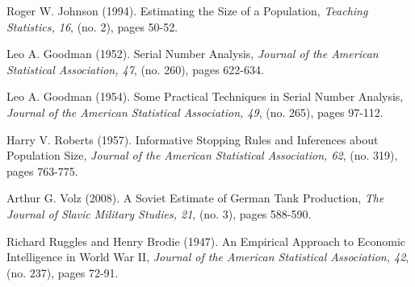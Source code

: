 \bigskip


\begin{thebibliography}{10}

 Roger W. Johnson (1994). Estimating the Size of a Population, {\em Teaching Statistics, 16}, (no. 2), pages 50-52.

 Leo A. Goodman (1952). Serial Number Analysis, {\em Journal of the American Statistical Association, 47}, (no. 260), pages 622-634.

 Leo A. Goodman (1954). Some Practical Techniques in Serial Number Analysis, {\em Journal of the American Statistical Association, 49}, (no. 265), pages 97-112.

 Harry V. Roberts (1957). Informative Stopping Rules and Inferences about Population Size, {\em Journal of the American Statistical Association, 62}, (no. 319), pages 763-775.

 Arthur G. Volz (2008). A Soviet Estimate of German Tank Production, {\em The Journal of Slavic Military Studies, 21}, (no. 3), pages 588-590.

 Richard Ruggles and Henry Brodie (1947). An Empirical Approach to Economic Intelligence in World War II, {\em Journal of the American Statistical Association, 42}, (no. 237), pages 72-91.

\end{thebibliography}
